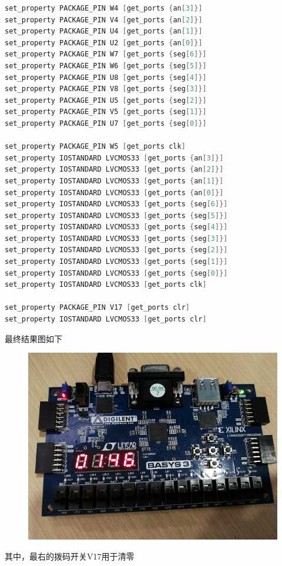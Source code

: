 \documentclass[11pt,UTF8]{ctexart}
\begin{document}
\begin{lstlisting}[language=Verilog,basicstyle=\tiny]
set_property PACKAGE_PIN W4 [get_ports {an[3]}]
set_property PACKAGE_PIN V4 [get_ports {an[2]}]
set_property PACKAGE_PIN U4 [get_ports {an[1]}]
set_property PACKAGE_PIN U2 [get_ports {an[0]}]
set_property PACKAGE_PIN W7 [get_ports {seg[6]}]
set_property PACKAGE_PIN W6 [get_ports {seg[5]}]
set_property PACKAGE_PIN U8 [get_ports {seg[4]}]
set_property PACKAGE_PIN V8 [get_ports {seg[3]}]
set_property PACKAGE_PIN U5 [get_ports {seg[2]}]
set_property PACKAGE_PIN V5 [get_ports {seg[1]}]
set_property PACKAGE_PIN U7 [get_ports {seg[0]}]

set_property PACKAGE_PIN W5 [get_ports clk]
set_property IOSTANDARD LVCMOS33 [get_ports {an[3]}]
set_property IOSTANDARD LVCMOS33 [get_ports {an[2]}]
set_property IOSTANDARD LVCMOS33 [get_ports {an[1]}]
set_property IOSTANDARD LVCMOS33 [get_ports {an[0]}]
set_property IOSTANDARD LVCMOS33 [get_ports {seg[6]}]
set_property IOSTANDARD LVCMOS33 [get_ports {seg[5]}]
set_property IOSTANDARD LVCMOS33 [get_ports {seg[4]}]
set_property IOSTANDARD LVCMOS33 [get_ports {seg[3]}]
set_property IOSTANDARD LVCMOS33 [get_ports {seg[2]}]
set_property IOSTANDARD LVCMOS33 [get_ports {seg[1]}]
set_property IOSTANDARD LVCMOS33 [get_ports {seg[0]}]
set_property IOSTANDARD LVCMOS33 [get_ports clk]

set_property PACKAGE_PIN V17 [get_ports clr]
set_property IOSTANDARD LVCMOS33 [get_ports clr]
\end{lstlisting}
\par 最终结果图如下
\begin{figure}[H]
    \centering
    \includegraphics[width=\linewidth]{fig/board.jpg}
\end{figure}
\par 其中，最右的拨码开关V17用于清零
\end{document}
